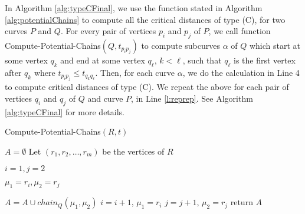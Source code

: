 \documentclass[12pt]{dalthesis}
\begin{document}
In Algorithm \ref{alg:typeCFinal}, we use the function stated 
in Algorithm \ref{alg:potentialChains}
to compute all the critical distances of type (C), 
for two curves $P$ and $Q$. 
For every pair of vertices $p_i$ and $p_j$ of $P$,
we call function {\sc Compute-Potential-Chains}$(Q, t_{p_ip_j})$ 
to compute subcurves $\alpha$ of $Q$ which start
at some vertex $q_k$ and end at some vertex $q_\ell$,
$k < \ell$, such that $q_\ell$ is the first vertex 
after $q_k$ where $t_{p_ip_j} \le t_{q_kq_\ell}$.
Then, for each curve $\alpha$, 
we do the calculation in Line 4 to compute critical distances of type (C).
We repeat the above for each pair of vertices $q_i$ and $q_j$ of $Q$
and curve $P$, in Line \ref{l:reprep}.
See Algorithm \ref{alg:typeCFinal} for more details.




\begin{algorithm} [t]
\caption {\sc Compute-Potential-Chains$(R, t)$ } 
\label{alg:potentialChains}
\begin{algorithmic}[1]
	\vspace{0.5em}
	\baselineskip
	\STATE $A = \emptyset	$
	\STATE Let $(r_1,r_2,\dots,r_m)$ be the vertices of $R$


	\STATE\label{l:0} $i = 1, j = 2$
	
	\STATE\label{l:0} $\mu_1 =r_i, \mu_2 = r_j$
	 \label{l:loopPot}

	\STATE $A = A \cup chain_Q(\mu_1,\mu_2)$ 
	\STATE $i = i + 1$, $\mu_1 =r_i$\ELSE 
	\STATE $j = j + 1$, $\mu_2 =r_j$\ENDIF
	\ENDWHILE
	\ENDIF
	\STATE  return $A$
	
	
\end{algorithmic}
\end{algorithm}
\end{document}
